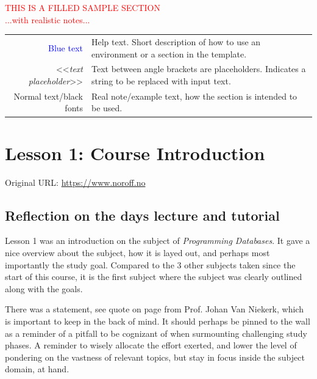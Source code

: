 
{\begin{center}
    \textcolor{red}{\Huge{THIS IS A FILLED SAMPLE SECTION}\\[4mm] ...with realistic notes...}

    \begin{tabular}{r @{: } p{80mm}}
        {\textcolor{blue}{Blue text}} &  Help text. Short description of how to use an environment or a section in the template.\\
        <<{\emph{text placeholder}}>> & Text between angle brackets are placeholders. Indicates a string to be replaced with input text.\\
        Normal text/black fonts & Real note/example text, how the section is intended to be used.
    \end{tabular}

\end{center}

\section{Lesson 1: Course Introduction}

Original URL: \url{https://www.noroff.no}


\subsection{Reflection on the days lecture and tutorial}

Lesson 1 was an introduction on the subject of {\emph{Programming Databases}}. It gave a nice overview about the subject, how it is layed out, and perhaps most importantly the study goal. Compared to the 3 other subjects taken since the start of this course, it is the first subject where the subject was clearly outlined along with the goals.

There was a statement, see quote on page \pageref{quote} from Prof. Johan Van Niekerk, which is important to keep in the back of mind. It should perhaps be pinned to the wall as a reminder of a pitfall to be cognizant of when surmounting challenging study phases. A reminder to wisely allocate the effort exerted, and lower the level of pondering on the vastness of relevant topics, but stay in focus inside the subject domain, at hand.

}
